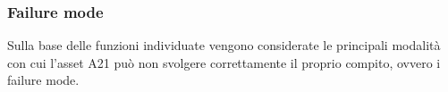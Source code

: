 \subsubsection{Failure mode}
Sulla base delle funzioni individuate vengono considerate le principali modalità con cui l'asset A21 può non svolgere correttamente il proprio compito, ovvero i failure mode.










